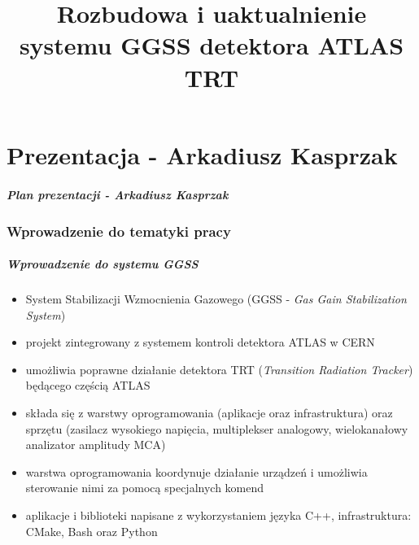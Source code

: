 \documentclass[10pt]{beamer}
\title{Rozbudowa i uaktualnienie systemu GGSS detektora ATLAS TRT}
\author{\normalsize{Arkadiusz Kasprzak \newline \and 
    Jarosław Cierpich \newline \newline \and 
    Opiekun pracy: dr hab. inż. Bartosz Mindur, prof. AGH}}
\date{}
\begin{document}
\titleframe[pl]

\part{Prezentacja - Arkadiusz Kasprzak}

\begin{frame}
\frametitle{Plan prezentacji - Arkadiusz Kasprzak}
\tableofcontents
\end{frame}


\section{Wprowadzenie do tematyki pracy}

\begin{frame}
\frametitle{Wprowadzenie do systemu GGSS}
\begin{itemize}
    \item System Stabilizacji Wzmocnienia Gazowego (GGSS - \emph{Gas Gain Stabilization System})
    \item projekt zintegrowany z systemem kontroli detektora ATLAS w CERN
    \item umożliwia poprawne działanie detektora TRT (\emph{Transition Radiation Tracker}) będącego częścią ATLAS
    \item składa się z warstwy oprogramowania (aplikacje oraz infrastruktura) oraz sprzętu (zasilacz wysokiego napięcia, multiplekser analogowy, wielokanałowy analizator amplitudy MCA)
    \item warstwa oprogramowania koordynuje działanie urządzeń i umożliwia sterowanie nimi za pomocą specjalnych komend
    \item aplikacje i biblioteki napisane z wykorzystaniem języka C++, infrastruktura: CMake, Bash oraz Python
\end{itemize}
\end{frame}
\end{document}
